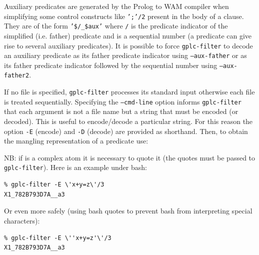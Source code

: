 Auxiliary predicates are generated by the Prolog to WAM compiler when
simplifying some control constructs like \texttt{';'/2} present in the body
of a clause. They are of the form
\texttt{'\$/\_\$aux'} where
\texttt{/} is the predicate indicator of the
simplified (i.e. father) predicate and  is a sequential
number (a predicate can give rise to several auxiliary predicates). It is
possible to force \texttt{gplc-filter} to decode an auxiliary predicate as its
father predicate indicator using \texttt{--aux-father} or as its father
predicate indicator followed by the sequential number using
\texttt{--aux-father2}.

If no file is specified, \texttt{gplc-filter} processes its standard input
otherwise each file is treated sequentially. Specifying the
\texttt{--cmd-line} option informs \texttt{gplc-filter} that each argument is not
a file name but a string that must be encoded (or decoded). This is useful to
encode/decode a particular string. For this reason the option \texttt{-E}
(encode) and \texttt{-D} (decode) are provided as
shorthand.  Then, to obtain the mangling representation of a predicate
 use:


NB: if  is a complex atom it is necessary to quote it 
(the quotes must be passed to \texttt{gplc-filter}). Here is an example under bash:

\begin{Indentation}
\begin{verbatim}
% gplc-filter -E \'x+y=z\'/3
X1_782B793D7A__a3
\end{verbatim}
\end{Indentation}

Or even more safely (using bash quotes to prevent bash from interpreting special characters):

\begin{Indentation}
\begin{verbatim}
% gplc-filter -E \''x+y=z'\'/3
X1_782B793D7A__a3
\end{verbatim}
\end{Indentation}


